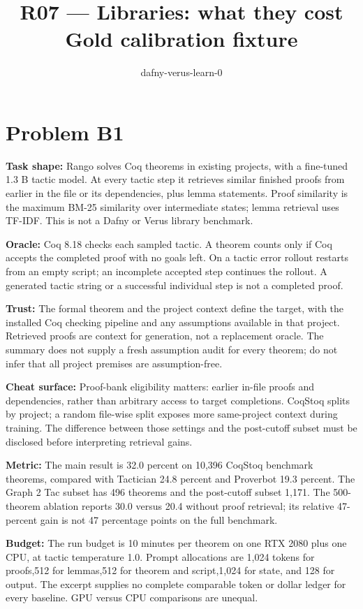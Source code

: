 \documentclass[11pt]{article}
\title{R07 --- Libraries: what they cost \\ \large Gold calibration fixture}
\author{dafny-verus-learn-0}
\date{}
\begin{document}
\maketitle
\section*{Problem B1}\label{ans:B1}
\begin{answer}
\textbf{Task shape:} Rango solves Coq theorems in existing projects, with a fine-tuned 1.3 B tactic model. At every tactic step it retrieves similar finished proofs from earlier in the file or its dependencies, plus lemma statements. Proof similarity is the maximum BM-25 similarity over intermediate states; lemma retrieval uses TF-IDF. This is not a Dafny or Verus library benchmark.

\textbf{Oracle:} Coq 8.18 checks each sampled tactic. A theorem counts only if Coq accepts the completed proof with no goals left. On a tactic error rollout restarts from an empty script; an incomplete accepted step continues the rollout. A generated tactic string or a successful individual step is not a completed proof.

\textbf{Trust:} The formal theorem and the project context define the target, with the installed Coq checking pipeline and any assumptions available in that project. Retrieved proofs are context for generation, not a replacement oracle. The summary does not supply a fresh assumption audit for every theorem; do not infer that all project premises are assumption-free.

\textbf{Cheat surface:} Proof-bank eligibility matters: earlier in-file proofs and dependencies, rather than arbitrary access to target completions. CoqStoq splits by project; a random file-wise split exposes more same-project context during training. The difference between those settings and the post-cutoff subset must be disclosed before interpreting retrieval gains.

\textbf{Metric:} The main result is 32.0 percent on 10,396 CoqStoq benchmark theorems, compared with Tactician 24.8 percent and Proverbot 19.3 percent. The Graph 2 Tac subset has 496 theorems and the post-cutoff subset 1,171. The 500-theorem ablation reports 30.0 versus 20.4 without proof retrieval; its relative 47-percent gain is not 47 percentage points on the full benchmark.

\textbf{Budget:} The run budget is 10 minutes per theorem on one RTX 2080 plus one CPU, at tactic temperature 1.0. Prompt allocations are 1,024 tokens for proofs,512 for lemmas,512 for theorem and script,1,024 for state, and 128 for output. The excerpt supplies no complete comparable token or dollar ledger for every baseline. GPU versus CPU comparisons are unequal.


\end{answer}
\end{document}
